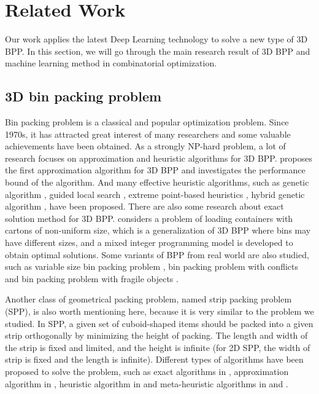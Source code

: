 \section{Related Work}
\label{sec:related}
Our work applies the latest Deep Learning technology to solve a new type of 3D BPP. In this section, we will go through the main research result of 3D BPP and machine learning method in combinatorial optimization.

\subsection{3D bin packing problem}

Bin packing problem is a classical and popular optimization problem. Since 1970s, it has attracted great interest of many researchers and some valuable achievements have been obtained. As a strongly NP-hard problem, a lot of research focuses on approximation and heuristic algorithms for 3D BPP. \cite{scheithauer1991three} proposes the first approximation algorithm for 3D BPP and investigates the performance bound of the algorithm. And many effective heuristic algorithms, such as genetic algorithm \cite{gonccalves2013biased}, guided local search \cite{faroe2003guided}, extreme point-based heuristics \cite{crainic2008extreme}, hybrid genetic algorithm \cite{kang2012hybrid}, have been proposed. There are also some research about exact solution method for 3D BPP. \cite{chen1995analytical} considers a problem of loading containers with cartons of non-uniform size, which is a generalization of 3D BPP where bins may have different sizes, and a mixed integer programming model is developed to obtain optimal solutions. Some variants of BPP from real world are also studied, such as variable size bin packing problem \cite{kang2003algorithms}, bin packing problem with conflicts \cite{khanafer2010new,gendreau2004heuristics} and bin packing problem with fragile objects \cite{clautiaux2014lower}. 

Another class of geometrical packing problem, named strip packing problem (SPP), is also worth mentioning here, because it is very similar to the problem we studied. In SPP, a given set of cuboid-shaped items should be packed into a given strip orthogonally by minimizing the height of packing. The length and width of the strip is fixed and limited, and the height is infinite (for 2D SPP, the width of strip is fixed and the length is infinite). Different types of algorithms have been proposed to solve the problem, such as exact algorithms in \cite{kenmochi2009exact}, approximation algorithm in \cite{steinberg1997strip}, heuristic algorithm in \cite{bortfeldt2007heuristic} and meta-heuristic algorithms in \cite{bortfeldt2006genetic} and \cite{hopper2001review}.

